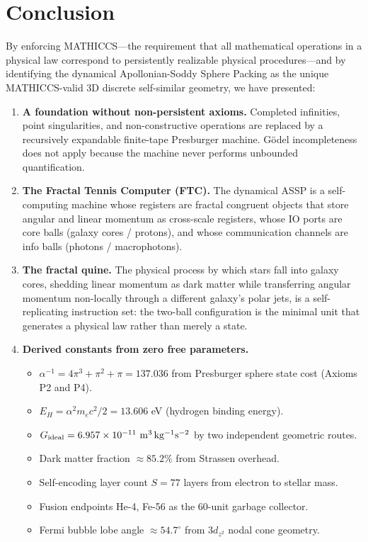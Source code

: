 \documentclass[11pt,a4paper]{article}
\begin{document}

\section{Conclusion}

By enforcing MATHICCS---the requirement that all mathematical operations in a physical law correspond to persistently realizable physical procedures---and by identifying the dynamical Apollonian-Soddy Sphere Packing as the unique MATHICCS-valid 3D discrete self-similar geometry, we have presented:

\begin{enumerate}

  \item \textbf{A foundation without non-persistent axioms.} Completed infinities, point singularities, and non-constructive operations are replaced by a recursively expandable finite-tape Presburger machine. Gödel incompleteness does not apply because the machine never performs unbounded quantification.

  \item \textbf{The Fractal Tennis Computer (FTC).} The dynamical ASSP is a self-computing machine whose registers are fractal congruent objects that store angular and linear momentum as cross-scale registers, whose IO ports are core balls (galaxy cores / protons), and whose communication channels are info balls (photons / macrophotons).

  \item \textbf{The fractal quine.} The physical process by which stars fall into galaxy cores, shedding linear momentum as dark matter while transferring angular momentum non-locally through a different galaxy's polar jets, is a self-replicating instruction set: the two-ball configuration is the minimal unit that generates a physical law rather than merely a state.

  \item \textbf{Derived constants from zero free parameters.}
    \begin{itemize}
      \item $\alpha^{-1} = 4\pi^3 + \pi^2 + \pi = 137.036$ from Presburger sphere state cost (Axioms P2 and P4).
      \item $E_H = \alpha^2 m_e c^2/2 = 13.606$ eV (hydrogen binding energy).
      \item $G_{\rm ideal} = 6.957\times10^{-11}\ \mathrm{m^3\,kg^{-1}s^{-2}}$ by two independent geometric routes.
      \item Dark matter fraction $\approx 85.2\%$ from Strassen overhead.
      \item Self-encoding layer count $S = 77$ layers from electron to stellar mass.
      \item Fusion endpoints He-4, Fe-56 as the 60-unit garbage collector.
      \item Fermi bubble lobe angle $\approx 54.7^\circ$ from $3d_{z^2}$ nodal cone geometry.
    \end{itemize}


\end{enumerate}
\end{document}

